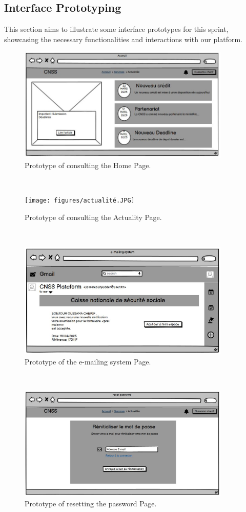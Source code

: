 \subsection{Interface Prototyping}
This section aims to illustrate some interface prototypes for this sprint, showcasing the necessary functionalities and interactions with our platform.
 \begin{figure}[h]
    \centering
    \includegraphics[width=0.9\textwidth]{figures/acceuil.JPG} 
    \caption{Prototype of consulting the Home Page.}
\end{figure}\
\begin{figure}[h]
    \centering
    \texttt{[image: figures/actualité.JPG]} 
    \caption{Prototype of consulting the Actuality Page.}
\end{figure}\
\clearpage
\begin{figure}[h]
    \centering
    \includegraphics[width=0.9\textwidth]{figures/e-mailing system.JPG} 
    \caption{Prototype of the e-mailing system Page.}
\end{figure}\
\begin{figure}[h]
    \centering
    \includegraphics[width=0.9\textwidth]{figures/reset password.JPG} 
    \caption{Prototype of resetting the password Page.}
\end{figure}\
